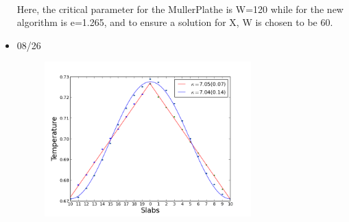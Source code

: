 \documentclass{article}
\begin{document}
\begin{itemize}
\paragraph*{}
Here, the critical parameter for the MullerPlathe is W=120 while for the new algorithm is e=1.265, and to ensure a solution for X, W is chosen to be 60.
\item {08/26}
\begin{figure}[h]
    \includegraphics[height=6cm]{amplitude1.png}
\end{figure}
\end{itemize}
\end{document}
